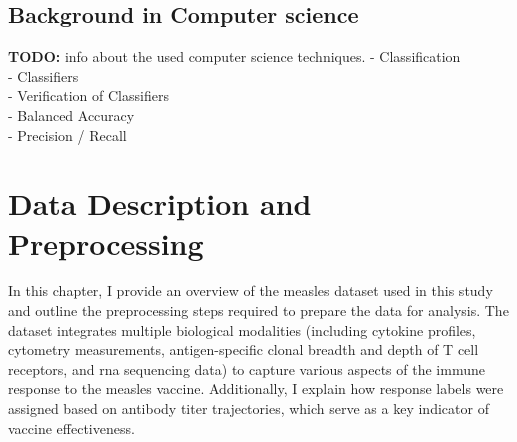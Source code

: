 \documentclass[12pt,a4paper]{report}
\newcommand{\todo}[1]{%
  \par\noindent%
  \begin{tcolorbox}[colback=yellow, colframe=black, boxrule=0.5pt, sharp corners, width=\linewidth, before skip=5pt, after skip=5pt]
    \textbf{TODO:} #1
  \end{tcolorbox}%
  \par
}
\begin{document}
\pagebreak
\section{Background in Computer science}
\todo{info about the used computer science techniques.
- Classification\\
- Classifiers\\
- Verification of Classifiers\\
- Balanced Accuracy\\
- Precision / Recall\\
}
\pagebreak





\chapter{Data Description and Preprocessing}
\noindent
In this chapter, I provide an overview of the measles dataset used in this study and outline the preprocessing steps required to prepare the data for analysis. The dataset integrates multiple biological modalities (including cytokine profiles, cytometry measurements, antigen-specific clonal breadth and depth of T cell receptors, and \acrshort{rna} sequencing data) to capture various aspects of the immune response to the measles vaccine. Additionally, I explain how response labels were assigned based on antibody titer trajectories, which serve as a key indicator of vaccine effectiveness.
\end{document}
